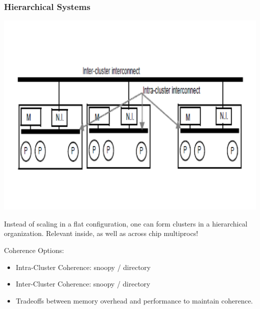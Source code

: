 \documentclass{beamer}
\newcommand{\emp}[1]{\textcolor{DikuRed}{ #1}}
\begin{document}
\begin{frame}[fragile,t]
\frametitle{Hierarchical Systems}

\vspace{-7ex}
\includegraphics[width=44ex]{FigsInfCoherence/HierarchSys}
\vspace{-5ex}

Instead of scaling in a flat configuration, one can form clusters
in a hierarchical organization.   Relevant inside, as well as 
across chip multiprocs!
\bigskip

\emp{Coherence Options:}
\begin{itemize}
    \item Intra-Cluster Coherence: snoopy / directory
    \item Inter-Cluster Coherence: snoopy / directory
    \item \alert{Tradeoffs} between memory overhead and performance to maintain coherence.
\end  {itemize}
\end{frame}
\end{document}
